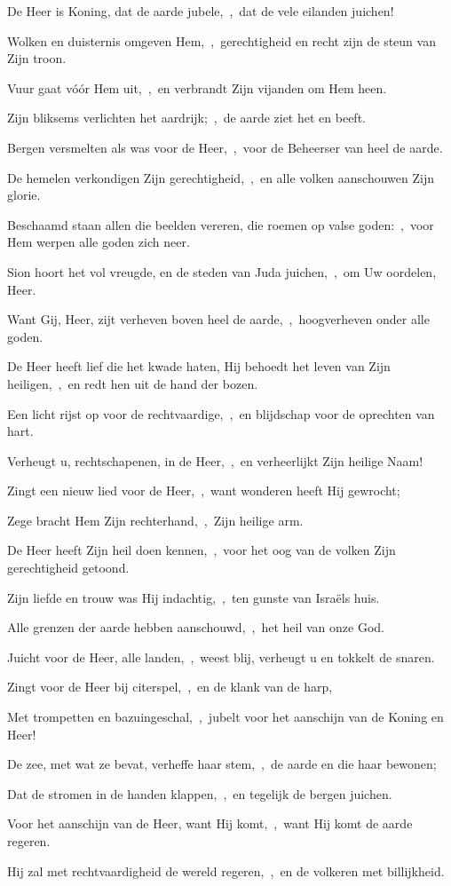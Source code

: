 \documentclass[12pt,twoside,a5paper]{article}
\begin{document}
\begin{halfparskip}
   De Heer is Koning, dat de aarde jubele,~\sep\ dat de vele eilanden juichen!

  Wolken en duisternis omgeven Hem,~\sep\ gerechtigheid en recht zijn de steun van Zijn troon.

  Vuur gaat vóór Hem uit,~\sep\ en verbrandt Zijn vijanden om Hem heen.

  Zijn bliksems verlichten het aardrijk;~\sep\ de aarde ziet het en beeft.

  Bergen versmelten als was voor de Heer,~\sep\ voor de Beheerser van heel de aarde.

  De hemelen verkondigen Zijn gerechtigheid,~\sep\ en alle volken aanschouwen Zijn glorie.

  Beschaamd staan allen die beelden vereren, die roemen op valse goden:~\sep\ voor Hem werpen alle goden zich neer.

  Sion hoort het vol vreugde, en de steden van Juda juichen,~\sep\ om Uw oordelen, Heer.

  Want Gij, Heer, zijt verheven boven heel de aarde,~\sep\ hoogverheven onder alle goden.

  De Heer heeft lief die het kwade haten, Hij behoedt het leven van Zijn heiligen,~\sep\ en redt hen uit de hand der bozen.

  Een licht rijst op voor de rechtvaardige,~\sep\ en blijdschap voor de oprechten van hart.

  Verheugt u, rechtschapenen, in de Heer,~\sep\ en verheerlijkt Zijn heilige Naam!
\end{halfparskip}

\begin{halfparskip}
   Zingt een nieuw lied voor de Heer,~\sep\ want wonderen heeft Hij gewrocht;

  Zege bracht Hem Zijn rechterhand,~\sep\ Zijn heilige arm.

  De Heer heeft Zijn heil doen kennen,~\sep\ voor het oog van de volken Zijn gerechtigheid getoond.

  Zijn liefde en trouw was Hij indachtig,~\sep\ ten gunste van Israëls huis.

  Alle grenzen der aarde hebben aanschouwd,~\sep\ het heil van onze God.

  Juicht voor de Heer, alle landen,~\sep\ weest blij, verheugt u en tokkelt de snaren.

  Zingt voor de Heer bij citerspel,~\sep\ en de klank van de harp,

  Met trompetten en bazuingeschal,~\sep\ jubelt voor het aanschijn van de Koning en Heer!

  De zee, met wat ze bevat, verheffe haar stem,~\sep\ de aarde en die haar bewonen;

  Dat de stromen in de handen klappen,~\sep\ en tegelijk de bergen juichen.

  Voor het aanschijn van de Heer, want Hij komt,~\sep\ want Hij komt de aarde regeren.

  Hij zal met rechtvaardigheid de wereld regeren,~\sep\ en de volkeren met billijkheid.
\end{halfparskip}
\end{document}
